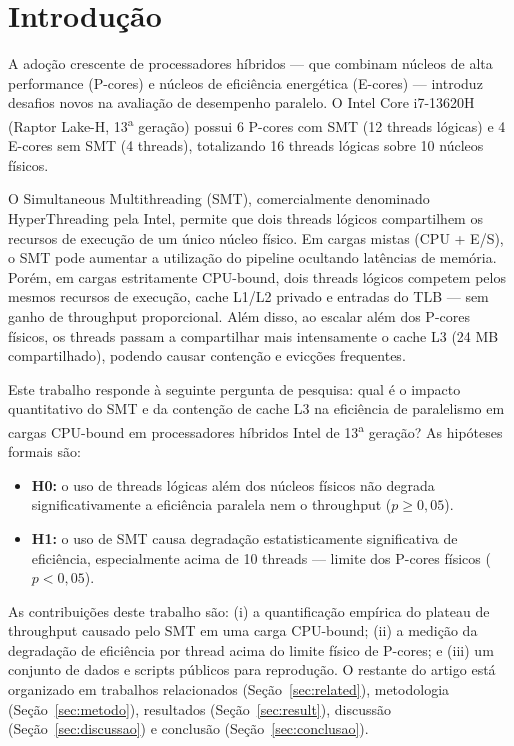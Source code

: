 \documentclass[12pt]{article}
\begin{document}
\section{Introdução}

A adoção crescente de processadores híbridos --- que combinam núcleos de alta
performance (P-cores) e núcleos de eficiência energética (E-cores) --- introduz
desafios novos na avaliação de desempenho paralelo. O Intel Core i7-13620H
(Raptor Lake-H, 13\textsuperscript{a} geração) possui 6 P-cores com SMT (12
threads lógicas) e 4 E-cores sem SMT (4 threads), totalizando 16 threads
lógicas sobre 10 núcleos físicos.

O Simultaneous Multithreading (SMT), comercialmente denominado HyperThreading
pela Intel, permite que dois threads lógicos compartilhem os recursos de
execução de um único núcleo físico. Em cargas mistas (CPU + E/S), o SMT pode
aumentar a utilização do pipeline ocultando latências de memória. Porém, em
cargas estritamente CPU-bound, dois threads lógicos competem pelos mesmos
recursos de execução, cache L1/L2 privado e entradas do TLB --- sem ganho de
throughput proporcional. Além disso, ao escalar além dos P-cores físicos, os
threads passam a compartilhar mais intensamente o cache L3 (24 MB
compartilhado), podendo causar contenção e evicções frequentes.

Este trabalho responde à seguinte pergunta de pesquisa: qual é o impacto
quantitativo do SMT e da contenção de cache L3 na eficiência de paralelismo em
cargas CPU-bound em processadores híbridos Intel de 13\textsuperscript{a}
geração? As hipóteses formais são:

\begin{itemize}
  \item \textbf{H0:} o uso de threads lógicas além dos núcleos físicos não
  degrada significativamente a eficiência paralela nem o throughput
  ($p \geq 0{,}05$).
  \item \textbf{H1:} o uso de SMT causa degradação estatisticamente
  significativa de eficiência, especialmente acima de 10 threads --- limite dos
  P-cores físicos ($p < 0{,}05$).
\end{itemize}

As contribuições deste trabalho são: (i) a quantificação empírica do plateau de
throughput causado pelo SMT em uma carga CPU-bound; (ii) a medição da
degradação de eficiência por thread acima do limite físico de P-cores; e (iii)
um conjunto de dados e scripts públicos para reprodução. O restante do artigo
está organizado em trabalhos relacionados (Seção~\ref{sec:related}), metodologia
(Seção~\ref{sec:metodo}), resultados (Seção~\ref{sec:result}), discussão
(Seção~\ref{sec:discussao}) e conclusão (Seção~\ref{sec:conclusao}).
\end{document}
